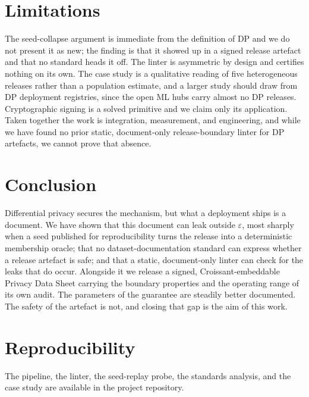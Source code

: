 \documentclass[conference]{IEEEtran}
\newcommand{\eps}{\varepsilon}
\begin{document}
\section{Limitations}\label{sec:limits}
The seed-collapse argument is immediate from the definition of DP and we do not present it as new; the
finding is that it showed up in a signed release artefact and that no standard heads it off. The linter
is asymmetric by design and certifies nothing on its own. The case study is a qualitative reading of
five heterogeneous releases rather than a population estimate, and a larger study should draw from DP
deployment registries, since the open ML hubs carry almost no DP releases. Cryptographic signing is a
solved primitive and we claim only its application. Taken together the work is integration,
measurement, and engineering, and while we have found no prior static, document-only release-boundary
linter for DP artefacts, we cannot prove that absence.

\section{Conclusion}
Differential privacy secures the mechanism, but what a deployment ships is a document. We have shown
that this document can leak outside $\eps$, most sharply when a seed published for reproducibility turns
the release into a deterministic membership oracle; that no dataset-documentation standard can express
whether a release artefact is safe; and that a static, document-only linter can check for the leaks
that do occur. Alongside it we release a signed, Croissant-embeddable Privacy Data Sheet carrying the
boundary properties and the operating range of its own audit. The parameters of the guarantee are
steadily better documented. The safety of the artefact is not, and closing that gap is the aim of this
work.

\section*{Reproducibility}
The pipeline, the linter, the seed-replay probe, the standards analysis, and the case study are
available in the project repository. %
\end{document}
